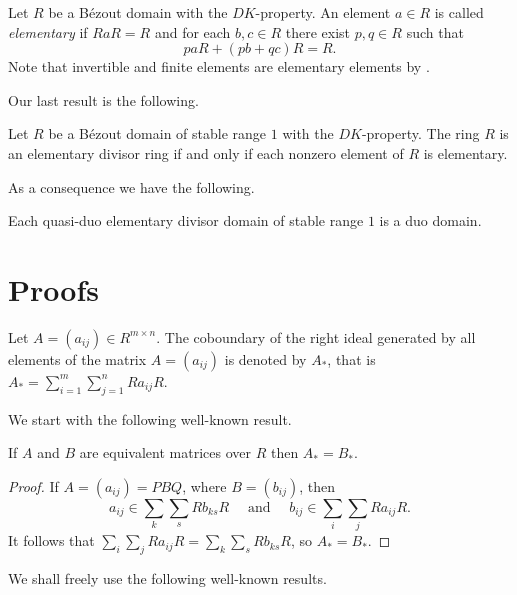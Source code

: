 \documentclass{cimart}
\begin{document}

Let $R$ be a B\'ezout domain  with the $DK$-property.    An element   $a\in R$ is called {\it elementary} if $RaR=R$  and  for each  $b,c\in R$ there exist  $p,q\in R$ such that
\[
paR+(pb+qc)R=R.
\]
Note that invertible and finite elements are  elementary  elements  by \cite[Theorem~2]{6-beauregard}.


Our last result is the following.

\begin{theorem}\label{ThR:8}
Let $R$ be a B\'ezout domain of stable range $1$ with the $DK$-property.   The ring  $R$ is an elementary divisor ring  if and only if each nonzero element of $R$ is elementary.
\end{theorem}


As a consequence we have the following.


\begin{corollary}\label{Cor:8}
Each  quasi-duo elementary divisor domain of  stable range $1$ is a duo domain.
\end{corollary}



\section{Proofs}

Let $A=(a_{ij})\in R^{m\times n}$.  The coboundary of the right ideal generated by all  elements of the  matrix $A=(a_{ij})$  is  denoted by $A_*$,
that is $A_*=\sum\limits_{i=1}^m\sum\limits_{j=1}^n Ra_{ij}R$.


We start with the following well-known result.

\begin{lemma}\label{LLL:1}
    If $A$ and $B$ are equivalent matrices over $R$ then $A_*=B_*$.
\end{lemma}
\begin{proof}
If $A=(a_{ij})=PBQ$, where  $B=(b_{ij})$, then
\[
a_{ij}\in \sum\limits_{k}\sum\limits_{s} Rb_{ks}R\quad \text{ and }\quad b_{ij}\in \sum\limits_{i}\sum\limits_{j} Ra_{ij}R.
\]
It follows that
$\sum\limits_{i}\sum\limits_{j} Ra_{ij}R= \sum\limits_{k}\sum\limits_{s} Rb_{ks}R$, so
 $A_*=B_*$.
\end{proof}

We shall freely use  the following well-known results.
\end{document}

